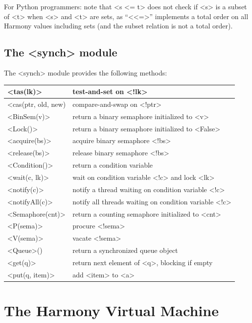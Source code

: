 \documentclass{report}
\begin{document}
\vspace{1em}
For Python programmers: note that <{s <= t}> does not check if <{s}> is a subset of
<{t}> when <{s}> and <{t}> are sets, as ``<{<=}>'' implements a total order on all Harmony values including sets (and the subset relation is not a total order).

\section{The <{synch}> module}

%
The <{synch}> module provides the following methods:

\vspace{1em}
\begin{tabular}{|l|l|}
\hline
<{tas(lk)}> & test-and-set on <{!lk}> \\
\hline
<{cas}(ptr, old, new)}> & compare-and-swap on <{!ptr}> \\
\hline
<{BinSem(v)}> & return a binary semaphore initialized to <{v}> \\
\hline
<{Lock()}> & return a binary semaphore initialized to <{False}> \\
\hline
<{acquire(bs)}> & acquire binary semaphore <{!bs}> \\
\hline
<{release(bs)}> & release binary semaphore <{!bs}> \\
\hline
<{Condition()}> & return a condition variable \\
\hline
<{wait(c, lk)}> & wait on condition variable <{!c}>
and lock <{lk}> \\ \hline
<{notify(c)}> & notify a thread waiting on condition variable <{!c}> \\
\hline
<{notifyAll(c)}> & notify all threads waiting on condition variable <{!c}> \\
\hline
<{Semaphore(cnt)}> & return a counting semaphore initialized to <{cnt}> \\
\hline
<{P(sema)}> & procure <{!sema}>  \\
\hline
<{V(sema)}> & vacate <{!sema}>  \\
\hline
<{Queue}>() & return a synchronized queue object \\
\hline
<{get(q)}> & return next element of <{q}>, blocking if empty \\
\hline
<{put(q, item)}> & add <{item}> to <{a}> \\
\hline
\end{tabular}


\chapter{The Harmony Virtual Machine}\label{app:hvm}
\end{document}
